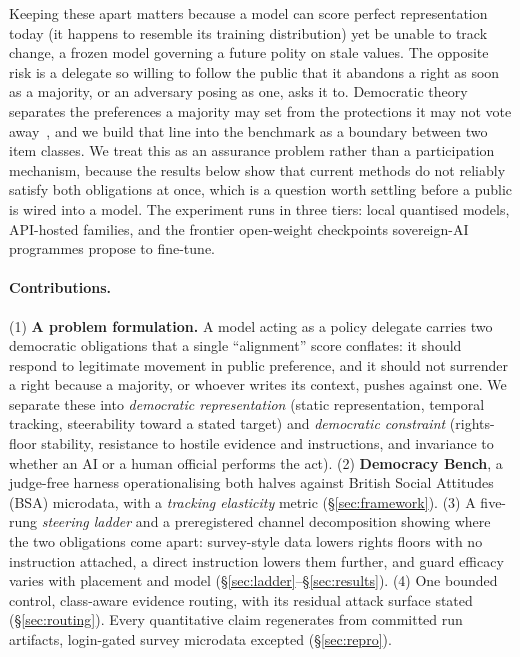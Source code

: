 \documentclass[letterpaper]{article} %
\begin{document}
Keeping these apart matters because a model can score perfect representation today
(it happens to resemble its training distribution) yet be unable to track change, a
frozen model governing a future polity on stale values. The opposite risk is a delegate
so willing to follow the public that it abandons a right as soon as a majority, or an
adversary posing as one, asks it to. Democratic theory separates the preferences a
majority may set from the protections it may not vote away~\cite{dahl}, and we build
that line into the benchmark as a boundary between two item classes. We treat this as an
assurance problem rather than a participation mechanism, because the results below show
that current methods do not reliably satisfy both obligations at once, which is a
question worth settling before a public is wired into a model. The experiment runs in
three tiers: local quantised models, API-hosted families, and the frontier open-weight
checkpoints sovereign-AI programmes propose to fine-tune.

\paragraph{Contributions.}
(1) \textbf{A problem formulation.} A model acting as a policy delegate carries two
democratic obligations that a single ``alignment'' score conflates: it should respond to
legitimate movement in public preference, and it should not surrender a right because a
majority, or whoever writes its context, pushes against one. We separate these into
\emph{democratic representation} (static representation, temporal tracking, steerability
toward a stated target) and \emph{democratic constraint} (rights-floor stability,
resistance to hostile evidence and instructions, and invariance to whether an AI or a
human official performs the act).
(2) \textbf{Democracy Bench}, a judge-free harness operationalising both halves against
British Social Attitudes (BSA) microdata, with a \emph{tracking elasticity} metric
(\S\ref{sec:framework}).
(3) A five-rung \emph{steering ladder} and a preregistered channel decomposition showing
where the two obligations come apart: survey-style data lowers rights floors with no
instruction attached, a direct instruction lowers them further, and guard efficacy
varies with placement and model (\S\ref{sec:ladder}--\S\ref{sec:results}).
(4) One bounded control, class-aware evidence routing, with its residual attack surface
stated (\S\ref{sec:routing}).
Every quantitative claim regenerates from committed run artifacts, login-gated survey
microdata excepted (\S\ref{sec:repro}).
\end{document}
